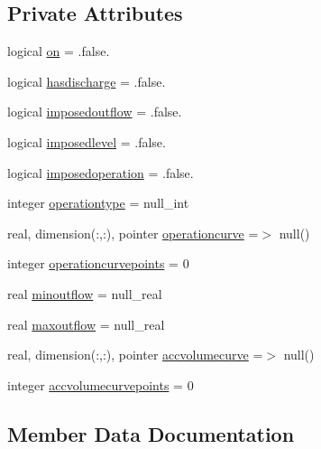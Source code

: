 \subsection*{Private Attributes}
\begin{DoxyCompactItemize}
\item 
logical \mbox{\hyperlink{structmodulereservoirs_1_1t__management_ad0eff0b17c7f089b834ef9a43c3680dd}{on}} = .false.
\item 
logical \mbox{\hyperlink{structmodulereservoirs_1_1t__management_a69a1cc51f5e6e45828a9f29bbc983fc3}{hasdischarge}} = .false.
\item 
logical \mbox{\hyperlink{structmodulereservoirs_1_1t__management_a946fd84c3cb8220a6e40fc76fbd77838}{imposedoutflow}} = .false.
\item 
logical \mbox{\hyperlink{structmodulereservoirs_1_1t__management_a268f97d7da2e0674c59759dcef4859ad}{imposedlevel}} = .false.
\item 
logical \mbox{\hyperlink{structmodulereservoirs_1_1t__management_a8054b3aa8bbbabe49d68204f9360b041}{imposedoperation}} = .false.
\item 
integer \mbox{\hyperlink{structmodulereservoirs_1_1t__management_a117b5ce08c6b77cc69b9cb5717e2f357}{operationtype}} = null\+\_\+int
\item 
real, dimension(\+:,\+:), pointer \mbox{\hyperlink{structmodulereservoirs_1_1t__management_aa5358b89a8f941fa6839519cf8eacadd}{operationcurve}} =$>$ null()
\item 
integer \mbox{\hyperlink{structmodulereservoirs_1_1t__management_a6e530b14aa0e50f762cf3a46ad61114e}{operationcurvepoints}} = 0
\item 
real \mbox{\hyperlink{structmodulereservoirs_1_1t__management_a5e3b67a746d3082b53672b3205ff39a1}{minoutflow}} = null\+\_\+real
\item 
real \mbox{\hyperlink{structmodulereservoirs_1_1t__management_a15027c2976c9f3d54ea9ba6a96c6b459}{maxoutflow}} = null\+\_\+real
\item 
real, dimension(\+:,\+:), pointer \mbox{\hyperlink{structmodulereservoirs_1_1t__management_aea78bc61514ffba81b2caf37fef520da}{accvolumecurve}} =$>$ null()
\item 
integer \mbox{\hyperlink{structmodulereservoirs_1_1t__management_a4a9401b5744e765627502871561e8de8}{accvolumecurvepoints}} = 0
\end{DoxyCompactItemize}


\subsection{Member Data Documentation}
\mbox{\label{structmodulereservoirs_1_1t__management_aea78bc61514ffba81b2caf37fef520da}} 
